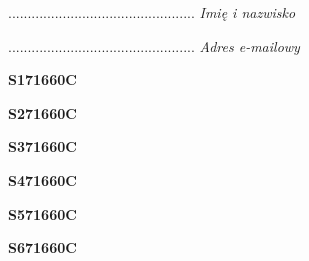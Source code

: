 \begin{turn}{90}\begin{minipage}{\linewidth} \vspace{20mm} ................................................  \textit{Imię i nazwisko}\end{minipage}\end{turn}

\begin{turn}{90}\begin{minipage}{\linewidth} \vspace{20mm} ................................................  \textit{Adres e-mailowy}\end{minipage}\end{turn}

\begin{turn}{90}\huge \begin{minipage}{\linewidth} \vspace{10mm}\textbf{S171660C}\end{minipage}\end{turn}

\begin{turn}{90}\huge \begin{minipage}{\linewidth} \vspace{10mm}\textbf{S271660C}\end{minipage}\end{turn}

\begin{turn}{90}\huge \begin{minipage}{\linewidth} \vspace{10mm}\textbf{S371660C}\end{minipage}\end{turn}

\begin{turn}{90}\huge \begin{minipage}{\linewidth} \vspace{10mm}\textbf{S471660C}\end{minipage}\end{turn}

\begin{turn}{90}\huge \begin{minipage}{\linewidth} \vspace{10mm}\textbf{S571660C}\end{minipage}\end{turn}

\begin{turn}{90}\huge \begin{minipage}{\linewidth} \vspace{10mm}\textbf{S671660C}\end{minipage}\end{turn}

